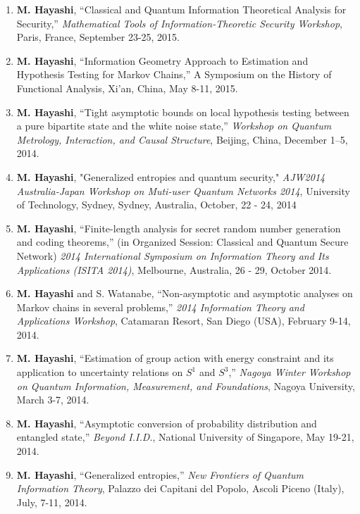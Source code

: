 \documentclass[a4paper,12pt,oneside]{article}
\begin{document}
\begin{enumerate}
\item 
\textbf{M. Hayashi}, ``Classical and Quantum Information Theoretical Analysis for Security,'' 
{\em Mathematical Tools of Information-Theoretic Security Workshop}, Paris, France, September 23-25, 2015.



\item 
\textbf{M. Hayashi},
``Information Geometry Approach to Estimation and Hypothesis Testing for Markov Chains,'' 
A Symposium on the History of Functional Analysis, Xi'an, 
China, May 8-11, 2015. 

\item 
\textbf{M. Hayashi}, 
``Tight asymptotic bounds on local hypothesis testing between a pure bipartite state and the white noise state,''
{\em Workshop on Quantum Metrology, Interaction, and Causal Structure},
Beijing, China, December 1--5, 2014. 

\item 
\textbf{M. Hayashi}, 
"Generalized entropies and quantum security," 
{\em AJW2014 Australia-Japan Workshop on Muti-user Quantum Networks 2014}, University of Technology, Sydney, Sydney, Australia, 
October, 22 - 24, 2014

\item 
\textbf{M. Hayashi},
``Finite-length analysis for secret random number generation and coding theorems,'' 
(in Organized Session: Classical and Quantum Secure Network) 
{\em 2014 International Symposium on Information Theory and Its Applications (ISITA 2014)}, Melbourne, Australia, 26 - 29, October 2014.

\item 
\textbf{M. Hayashi} and S. Watanabe, 
``Non-asymptotic and asymptotic analyses on Markov chains in several problems,'' 
{\em 2014 Information Theory and Applications Workshop}, 
Catamaran Resort, San Diego (USA), February 9-14, 2014.

\item 
\textbf{M. Hayashi}, 
``Estimation of group action with energy constraint and its application to uncertainty relations on $S^1$ and $S^3$,'' 
{\em Nagoya Winter Workshop on Quantum Information, Measurement, and Foundations}, 
Nagoya University, March 3-7, 2014.

\item 
\textbf{M. Hayashi}, 
``Asymptotic conversion of probability distribution and entangled state,'' {\em Beyond I.I.D.}, National University of Singapore, May 19-21, 2014.

\item 
\textbf{M. Hayashi}, 
``Generalized entropies,''
{\em New Frontiers of Quantum Information Theory}, 
Palazzo dei Capitani del Popolo, Ascoli Piceno (Italy),  July, 7-11, 2014.



\end{enumerate}
\end{document}
